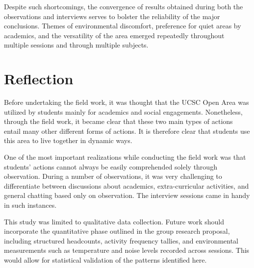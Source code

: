 \documentclass[12pt]{report}
\begin{document}
Despite such shortcomings, the convergence of results obtained during both the observations and interviews serves to bolster the reliability of the major conclusions. Themes of environmental discomfort, preference for quiet areas by academics, and the versatility of the area emerged repeatedly throughout multiple sessions and through multiple subjects.



\chapter{Reflection}

Before undertaking the field work, it was thought that the UCSC Open Area was utilized by students mainly for academics and social engagements. Nonetheless, through the field work, it became clear that these two main types of actions entail many other different forms of actions. It is therefore clear that students use this area to live together in dynamic ways.

One of the most important realizations while conducting the field work was that students' actions cannot always be easily comprehended solely through observation. During a number of observations, it was very challenging to differentiate between discussions about academics, extra-curricular activities, and general chatting based only on observation. The interview 
sessions came in handy in such instances.

This study was limited to qualitative data collection. Future work should incorporate the quantitative phase outlined in the group research proposal, including structured headcounts, activity frequency tallies, and environmental measurements such as temperature and noise levels recorded across sessions. This would allow for statistical validation of the patterns identified here.


\end{document}
